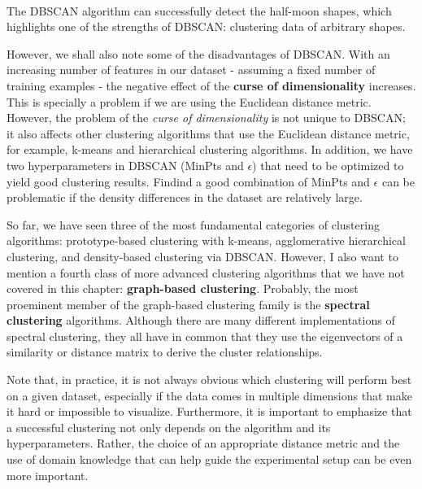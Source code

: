 \documentclass[11pt]{article}
\begin{document}
    \begin{center}
    \end{center}
    { \hspace*{\fill} \\}
    
    The DBSCAN algorithm can successfully detect the half-moon shapes, which
highlights one of the strengths of DBSCAN: clustering data of arbitrary
shapes.

However, we shall also note some of the disadvantages of DBSCAN. With an
increasing number of features in our dataset - assuming a fixed number
of training examples - the negative effect of the \textbf{curse of
dimensionality} increases. This is specially a problem if we are using
the Euclidean distance metric. However, the problem of the \emph{curse
of dimensionality} is not unique to DBSCAN; it also affects other
clustering algorithms that use the Euclidean distance metric, for
example, k-means and hierarchical clustering algorithms. In addition, we
have two hyperparameters in DBSCAN (MinPts and \(\epsilon\)) that need
to be optimized to yield good clustering results. Findind a good
combination of MinPts and \(\epsilon\) can be problematic if the density
differences in the dataset are relatively large.

So far, we have seen three of the most fundamental categories of
clustering algorithms: prototype-based clustering with k-means,
agglomerative hierarchical clustering, and density-based clustering via
DBSCAN. However, I also want to mention a fourth class of more advanced
clustering algorithms that we have not covered in this chapter:
\textbf{graph-based clustering}. Probably, the most proeminent member of
the graph-based clustering family is the \textbf{spectral clustering}
algorithms. Although there are many different implementations of
spectral clustering, they all have in common that they use the
eigenvectors of a similarity or distance matrix to derive the cluster
relationships.

Note that, in practice, it is not always obvious which clustering will
perform best on a given dataset, especially if the data comes in
multiple dimensions that make it hard or impossible to visualize.
Furthermore, it is important to emphasize that a successful clustering
not only depends on the algorithm and its hyperparameters. Rather, the
choice of an appropriate distance metric and the use of domain knowledge
that can help guide the experimental setup can be even more important.
\end{document}
